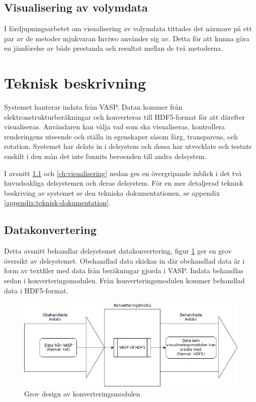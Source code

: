 \documentclass[a4paper,12pt,twoside,openright]{report}
\begin{document}
\subsection{Visualisering av volymdata}
I fördjupningsarbetet om visualisering av volymdata tittades det närmare på ett par av de metoder mjukvaran Inviwo använder sig av. Detta för att kunna göra en jämförelse av både prestanda och resultat mellan de två metoderna.
\section{Teknisk beskrivning}
\label{ch:teknisk-beskrivning}

Systemet hanterar indata från VASP. Datan kommer från elektronstrukturberäkningar och konverteras till HDF5-format för att därefter visualiseras. Användaren kan välja vad som ska visualiseras, kontrollera renderingens utseende och ställa in egenskaper såsom färg, transparens, och rotation. Systemet har delats in i delsystem och dessa har utvecklats och testats enskilt i den mån det inte funnits beroenden till andra delsystem.

I avsnitt \ref{ch:datakonvertering} och \ref{ch:visualisering} nedan ges en övergripande inblick i det två huvudsakliga delsystemen och deras delsystem. För en mer detaljerad teknisk beskriving av systemet se den tekniska dokumentationen, se appendix \ref{appendix:teknisk-dokumentation}.

\subsection{Datakonvertering}
\label{ch:datakonvertering}
Detta avsnitt behandlar delsystemet datakonvertering, figur \ref{fig:konverteringdetalj} ger en grov översikt av delsystemet. Obehandlad data skickas in där obehandlad data är i form av textfiler med data från beräkningar gjorda i VASP. Indata behandlas sedan i konverteringsmodulen. Från konverteringsmodulen kommer behandlad data i HDF5-format.

\begin{figure}[H]
	\centering
	\includegraphics[scale=0.55]{konverteringdetalj.png}
	\caption{Grov design av konverteringsmodulen}
	\label{fig:konverteringdetalj}
\end{figure}
\end{document}
